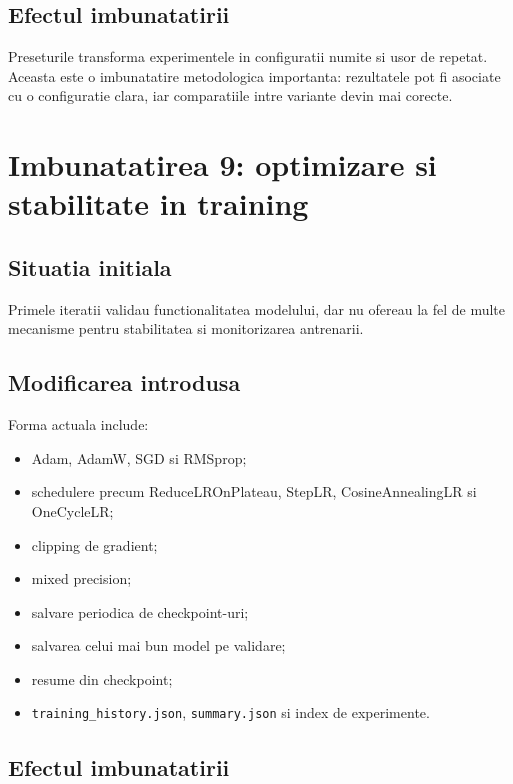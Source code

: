 \documentclass[12pt,a4paper]{article}
\begin{document}
\subsection{Efectul imbunatatirii}

Preseturile transforma experimentele in configuratii numite si usor de repetat.
Aceasta este o imbunatatire metodologica importanta: rezultatele pot fi asociate
cu o configuratie clara, iar comparatiile intre variante devin mai corecte.

\section{Imbunatatirea 9: optimizare si stabilitate in training}

\subsection{Situatia initiala}

Primele iteratii validau functionalitatea modelului, dar nu ofereau la fel de
multe mecanisme pentru stabilitatea si monitorizarea antrenarii.

\subsection{Modificarea introdusa}

Forma actuala include:

\begin{itemize}
    \item Adam, AdamW, SGD si RMSprop;
    \item schedulere precum ReduceLROnPlateau, StepLR, CosineAnnealingLR si
    OneCycleLR;
    \item clipping de gradient;
    \item mixed precision;
    \item salvare periodica de checkpoint-uri;
    \item salvarea celui mai bun model pe validare;
    \item resume din checkpoint;
    \item \texttt{training\_history.json}, \texttt{summary.json} si index de
    experimente.
\end{itemize}

\subsection{Efectul imbunatatirii}
\end{document}
